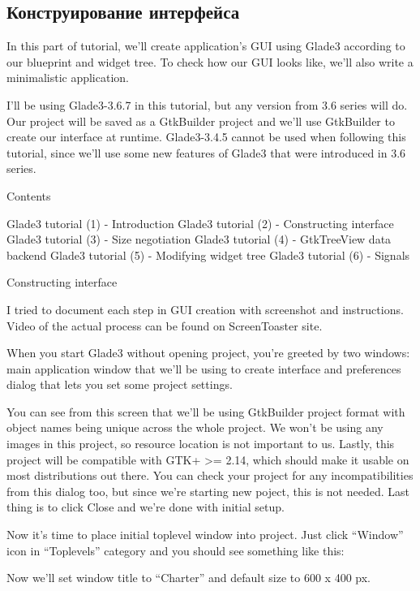 \documentclass[a4paper,openany,twoside,final]{book}
\begin{document}
\subsection{Конструирование интерфейса}
\label{sec:gladeint}

In this part of tutorial, we'll create application's GUI using Glade3 according to our blueprint and widget tree. To check how our GUI looks like, we'll also write a minimalistic application.

I'll be using Glade3-3.6.7 in this tutorial, but any version from 3.6 series will do. Our project will be saved as a GtkBuilder project and we'll use GtkBuilder to create our interface at runtime. Glade3-3.4.5 cannot be used when following this tutorial, since we'll use some new features of Glade3 that were introduced in 3.6 series.

Contents

    Glade3 tutorial (1) - Introduction
    Glade3 tutorial (2) - Constructing interface
    Glade3 tutorial (3) - Size negotiation
    Glade3 tutorial (4) - GtkTreeView data backend
    Glade3 tutorial (5) - Modifying widget tree
    Glade3 tutorial (6) - Signals

Constructing interface

I tried to document each step in GUI creation with screenshot and instructions. Video of the actual process can be found on ScreenToaster site.

When you start Glade3 without opening project, you're greeted by two windows: main application window that we'll be using to create interface and preferences dialog that lets you set some project settings.

You can see from this screen that we'll be using GtkBuilder project format with object names being unique across the whole project. We won't be using any images in this project, so resource location is not important to us. Lastly, this project will be compatible with GTK+ >= 2.14, which should make it usable on most distributions out there. You can check your project for any incompatibilities from this dialog too, but since we're starting new poject, this is not needed. Last thing is to click Close and we're done with initial setup.

Now it's time to place initial toplevel window into project. Just click ``Window'' icon in ``Toplevels'' category and you should see something like this:

 Now we'll set window title to ``Charter'' and default size to 600 x 400 px.
\end{document}

